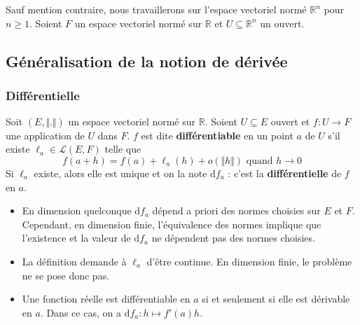 




  Sauf mention contraire, nous travaillerons sur l'espace vectoriel normé $\mathbb{R}^n$ pour $n \geq 1$. Soient $F$ un espace vectoriel normé sur $\mathbb{R}$ et $U \subseteq \mathbb{R}^n$ un ouvert.

  \subsection{Généralisation de la notion de dérivée}

  \subsubsection{Différentielle}


  \begin{definition}
    Soit $(E, \Vert . \Vert)$ un espace vectoriel normé sur $\mathbb{R}$. Soient $U \subseteq E$ ouvert et $f : U \rightarrow F$ une application de $U$ dans $F$. $f$ est dite \textbf{différentiable} en un point $a$ de $U$ s'il existe $\ell_a \in \mathcal{L}(E,F)$ telle que
    \[ f(a+h) = f(a) + \ell_a(h) + o(\Vert h \Vert) \text{ quand } h \longrightarrow 0 \]
    Si $\ell_a$ existe, alors elle est unique et on la note $\mathrm{d}f_a$ : c'est la \textbf{différentielle} de $f$ en $a$.
  \end{definition}

  \begin{remark}
    \begin{itemize}
      \item En dimension quelconque $\mathrm{d}f_a$ dépend a priori des normes choisies sur $E$ et $F$. Cependant, en dimension finie, l'équivalence des normes implique que l'existence et la valeur de $\mathrm{d}f_a$ ne dépendent pas des normes choisies.
      \item La définition demande à $\ell_a$ d'être continue. En dimension finie, le problème ne se pose donc pas.
      \item Une fonction réelle est différentiable en $a$ si et seulement si elle est dérivable en $a$. Dans ce cas, on a $\mathrm{d}f_a : h \mapsto f'(a)h$.
    \end{itemize}
  \end{remark}

